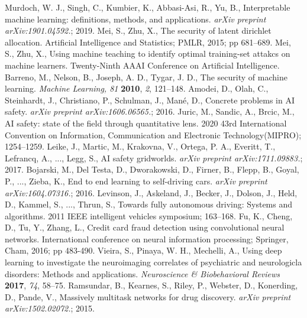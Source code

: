 \documentclass[journal,article,submit,moreauthors,pdftex]{Definitions/mdpi}
\begin{document}
\begin{thebibliography}{999}
Murdoch, W. J., Singh, C., Kumbier, K., Abbasi-Asi, R., Yu, B., Interpretable machine learning: definitions, methods, and applications. \textit{arXiv preprint arXiv:1901.04592.}; 2019.
Mei, S., Zhu, X., The security of latent dirichlet allocation. Artificial Intelligence and Statistics; PMLR, 2015; pp 681--689.
Mei, S., Zhu, X., Using machine teaching to identify optimal training-set attakcs on machine learners. Twenty-Ninth AAAI Conference on Artificial Intelligence.
Barreno, M., Nelson, B., Joseph, A. D., Tygar, J. D.,  The security of machine learning. {\em Machine Learning, 81} {\bf 2010}, {\em 2}, 121--148.
Amodei, D., Olah, C., Steinhardt, J., Christiano, P., Schulman, J., Mané, D., Concrete problems in AI safety. \textit{arXiv preprint arXiv:1606.06565.}; 2016.
Juric, M., Sandic, A., Brcic, M., AI safety: state of the field through quantitative lens. 2020 43rd International Convention on Information, Communication and Electronic Technology(MIPRO); 1254--1259.
Leike, J., Martic, M., Krakovna, V., Ortega, P. A., Everitt, T., Lefrancq, A., ..., Legg, S., AI safety gridworlds. \textit{arXiv preprint arXiv:1711.09883.}; 2017.
Bojarski, M., Del Testa, D., Dworakowski, D., Firner, B., Flepp, B., Goyal, P., ..., Zieba, K., End to end learning to self-driving cars. \textit{arXiv preprint arXiv:1604.07316.}; 2016.
Levinson, J., Askeland, J., Becker, J., Dolson, J., Held, D., Kammel, S., ..., Thrun, S., Towards fully autonomous driving: Systems and algorithms. 2011 IEEE intelligent vehicles symposium; 163--168.
Fu, K., Cheng, D., Tu, Y., Zhang, L., Credit card fraud detection using convolutional neural networks. International conference on neural information processing; Springer, Cham, 2016; pp 483-490.
Vieira, S., Pinaya, W. H., Mechelli, A., Using deep learning to investigate the neuroimaging correlates of psychiatric and neurologicla disorders: Methods and applications. {\em Neuroscience \& Biobehavioral Reviews} {\bf 2017}, {\em 74}, 58--75.
Ramsundar, B., Kearnes, S., Riley, P., Webster, D., Konerding, D., Pande, V., Massively multitask networks for drug discovery. \textit{arXiv preprint arXiv:1502.02072.}; 2015.

\end{thebibliography}
\end{document}
